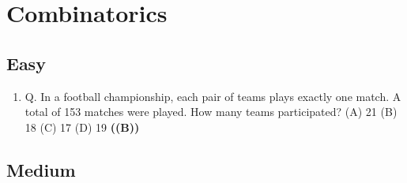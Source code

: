 \documentclass{article}
\begin{document}
\section{Combinatorics}
\subsection{Easy}
\begin{enumerate}
\item Q. In a football championship, each pair of teams plays exactly one match. A total of 153 matches were played. How many teams participated?
(A) 21
(B) 18
(C) 17
(D) 19 \hfill \textbf{((B))}
\end{enumerate}
\subsection{Medium}
\end{document}
